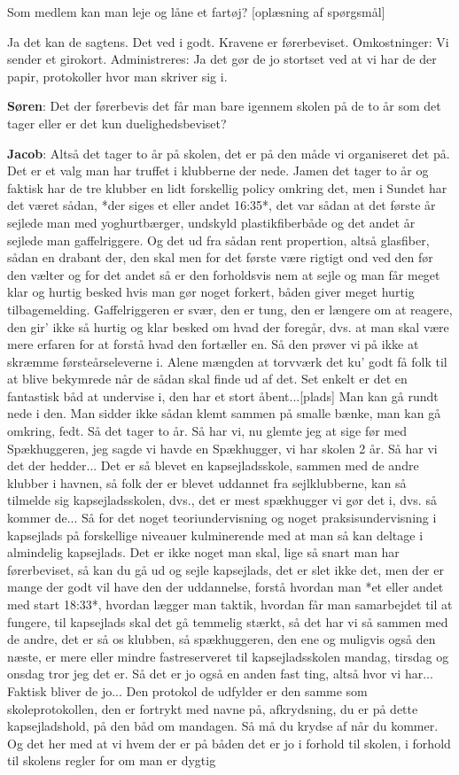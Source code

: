 Som medlem kan man leje og låne et fartøj? [oplæsning af spørgsmål]

Ja det kan de sagtens. Det ved i godt. Kravene er førerbeviset. Omkostninger: Vi sender et girokort. Administreres: Ja det gør de jo stortset ved at vi har de der papir, protokoller hvor man skriver sig i. 

\textbf{Søren}: Det der førerbevis det får man bare igennem skolen på de to år som det tager eller er det kun duelighedsbeviset?

\textbf{Jacob}: Altså det tager to år på skolen, det er på den måde vi organiseret det på. Det er et valg man har truffet i klubberne der nede. Jamen det tager to år og faktisk har de tre klubber en lidt forskellig policy omkring det, men i Sundet har det været sådan, *der siges et eller andet 16:35*, det var sådan at det første år sejlede man med yoghurtbærger, undskyld plastikfiberbåde og det andet år sejlede man gaffelriggere. Og det ud fra sådan rent propertion, altså glasfiber, sådan en drabant der, den skal men for det første være rigtigt ond ved den før den vælter og for det andet så er den forholdsvis nem at sejle og man får meget klar og hurtig besked hvis man gør noget forkert, båden giver meget hurtig tilbagemelding. Gaffelriggeren er  svær, den er tung, den er længere om at reagere, den gir' ikke så hurtig og klar besked om hvad der foregår, dvs. at man skal være mere erfaren for at forstå hvad den fortæller en. Så den prøver vi på ikke at skræmme førsteårseleverne i. Alene mængden at torvværk det ku' godt få folk til at blive bekymrede når de sådan skal finde ud af det. Set enkelt er det en fantastisk båd at undervise i, den har et stort åbent...[plads] Man kan gå rundt nede i den. Man sidder ikke sådan klemt sammen på smalle bænke, man kan gå omkring, fedt. Så det tager to år. Så har vi, nu glemte jeg at sige før med Spækhuggeren, jeg sagde vi havde en Spækhugger, vi har skolen 2 år. Så har vi det der hedder... Det er så blevet en kapsejladsskole, sammen med de andre klubber i havnen, så folk der er blevet uddannet fra sejlklubberne, kan så tilmelde sig kapsejladsskolen, dvs., det er mest spækhugger vi gør det i, dvs. så kommer de... Så for det noget teoriundervisning og noget praksisundervisning i kapsejlads på forskellige niveauer kulminerende med at man så kan deltage i almindelig kapsejlads. Det er ikke noget man skal, lige så snart man har førerbeviset, så kan du gå ud og sejle kapsejlads, det er slet ikke det, men der er mange der godt vil have den der uddannelse, forstå hvordan man *et eller andet med start 18:33*, hvordan lægger man taktik, hvordan får man samarbejdet til at fungere, til kapsejlads skal det gå temmelig stærkt, så det har vi så sammen med de andre, det er så os klubben, så spækhuggeren, den ene og muligvis også den næste, er mere eller mindre fastreserveret til kapsejladsskolen mandag, tirsdag og onsdag tror jeg det er. Så det er jo også en anden fast ting, altså hvor vi har... Faktisk bliver de jo... Den protokol de udfylder er den samme som skoleprotokollen, den er fortrykt med navne på, afkrydsning, du er på dette kapsejladshold, på den båd om mandagen. Så må du krydse af når du kommer. Og det her med at vi hvem der er på båden det er jo i forhold til skolen, i forhold til skolens regler for om man er dygtig 